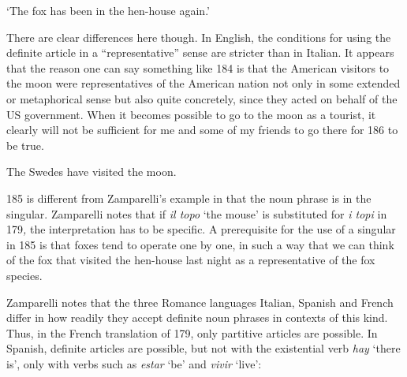 \begin{styleTranslation}
‘The fox has been in the hen-house again.’

\end{styleTranslation}

\begin{styleBodyTextFirst}
There are clear differences here though. In English, the conditions for using the definite article in a “representative” sense are stricter than in Italian. It appears that the reason one can say something like 184 is that the American visitors to the moon were representatives of the American nation not only in some extended or metaphorical sense but also quite concretely, since they acted on behalf of the US government. When it becomes possible to go to the moon as a tourist, it clearly will not be sufficient for me and some of my friends to go there for 186 to be true.

\end{styleBodyTextFirst}

\begin{listWWNumileveli}
\item {}

\begin{styleExample}
\label{bkm:Ref94431191}The Swedes have visited the moon.

\end{styleExample}

\end{listWWNumileveli}

\begin{styleBodyTextFirst}
185 is different from Zamparelli’s example in that the noun phrase is in the singular. Zamparelli notes that if \textit{il topo} ‘the mouse’ is substituted for \textit{i topi }in 179\textit{, }the interpretation has to be specific. A prerequisite for the use of a singular in 185 is that foxes tend to operate one by one, in such a way that we can think of the fox that visited the hen-house last night as a representative of the fox species. 

\end{styleBodyTextFirst}

\begin{styleBodytextC}
Zamparelli notes that the three Romance languages Italian, Spanish and French differ in how readily they accept definite noun phrases in contexts of this kind. Thus, in the French translation of 179, only partitive articles are possible. In Spanish, definite articles are possible, but not with the existential verb \textit{hay} ‘there is’, only with verbs such as \textit{estar} ‘be’ and \textit{vivir} ‘live’:

\end{styleBodytextC}

